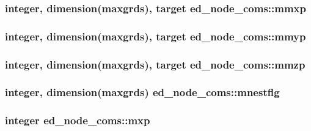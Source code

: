 \subsubsection[{mmxp}]{\setlength{\rightskip}{0pt plus 5cm}integer, dimension(maxgrds), target ed\+\_\+node\+\_\+coms\+::mmxp}\label{namespaceed__node__coms_a0a26786e048c93181d52c25d73142af6}
\hypertarget{namespaceed__node__coms_a79783fa824eaca254de5ceb5273f1ff2}{}
\subsubsection[{mmyp}]{\setlength{\rightskip}{0pt plus 5cm}integer, dimension(maxgrds), target ed\+\_\+node\+\_\+coms\+::mmyp}\label{namespaceed__node__coms_a79783fa824eaca254de5ceb5273f1ff2}
\hypertarget{namespaceed__node__coms_a9384e8659a53635a2fbec99d3b3ca02f}{}
\subsubsection[{mmzp}]{\setlength{\rightskip}{0pt plus 5cm}integer, dimension(maxgrds), target ed\+\_\+node\+\_\+coms\+::mmzp}\label{namespaceed__node__coms_a9384e8659a53635a2fbec99d3b3ca02f}
\hypertarget{namespaceed__node__coms_a9c6d2d73db66ee337e0d7a9b213b05d2}{}
\subsubsection[{mnestflg}]{\setlength{\rightskip}{0pt plus 5cm}integer, dimension(maxgrds) ed\+\_\+node\+\_\+coms\+::mnestflg}\label{namespaceed__node__coms_a9c6d2d73db66ee337e0d7a9b213b05d2}
\hypertarget{namespaceed__node__coms_aafd80e646c35b816ee0f00fabe97cc03}{}
\subsubsection[{mxp}]{\setlength{\rightskip}{0pt plus 5cm}integer ed\+\_\+node\+\_\+coms\+::mxp}\label{namespaceed__node__coms_aafd80e646c35b816ee0f00fabe97cc03}
\hypertarget{namespaceed__node__coms_a2248da5b8f20480c3d693062b51a186b}{}
